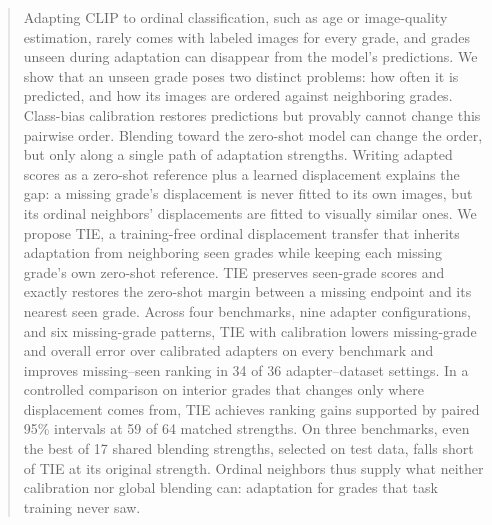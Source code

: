 \begin{abstract}
Adapting CLIP to ordinal classification, such as age or image-quality estimation, rarely comes with labeled images for every grade, and grades unseen during adaptation can disappear from the model's predictions. We show that an unseen grade poses two distinct problems: how often it is predicted, and how its images are ordered against neighboring grades. Class-bias calibration restores predictions but provably cannot change this pairwise order. Blending toward the zero-shot model can change the order, but only along a single path of adaptation strengths. Writing adapted scores as a zero-shot reference plus a learned displacement explains the gap: a missing grade's displacement is never fitted to its own images, but its ordinal neighbors' displacements are fitted to visually similar ones. We propose TIE, a training-free ordinal displacement transfer that inherits adaptation from neighboring seen grades while keeping each missing grade's own zero-shot reference. TIE preserves seen-grade scores and exactly restores the zero-shot margin between a missing endpoint and its nearest seen grade. Across four benchmarks, nine adapter configurations, and six missing-grade patterns, TIE with calibration lowers missing-grade and overall error over calibrated adapters on every benchmark and improves missing--seen ranking in 34 of 36 adapter--dataset settings. In a controlled comparison on interior grades that changes only where displacement comes from, TIE achieves ranking gains supported by paired 95\% intervals at 59 of 64 matched strengths. On three benchmarks, even the best of 17 shared blending strengths, selected on test data, falls short of TIE at its original strength. Ordinal neighbors thus supply what neither calibration nor global blending can: adaptation for grades that task training never saw.
\end{abstract}
